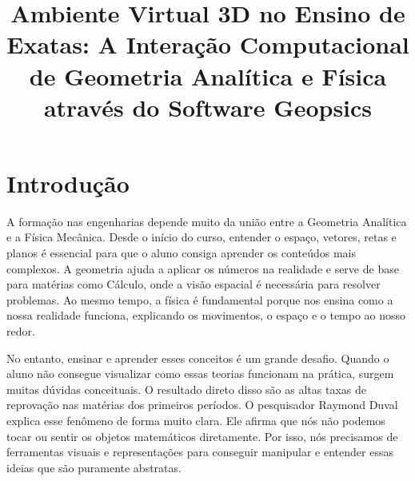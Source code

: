 \documentclass[conference,a4paper]{IEEEtran}
\begin{document}
\title{Ambiente Virtual 3D no Ensino de Exatas: A Interação Computacional de Geometria Analítica e Física através do Software Geopsics}

\author{
\and
}

\maketitle

\section{Introdução}

A formação nas engenharias depende muito da união entre a Geometria Analítica e a Física Mecânica. Desde o início do curso, entender o espaço, vetores, retas e planos é essencial para que o aluno consiga aprender os conteúdos mais complexos. A geometria ajuda a aplicar os números na realidade e serve de base para matérias como Cálculo, onde a visão espacial é necessária para resolver problemas. Ao mesmo tempo, a física é fundamental porque nos ensina como a nossa realidade funciona, explicando os movimentos, o espaço e o tempo ao nosso redor.

No entanto, ensinar e aprender esses conceitos é um grande desafio. Quando o aluno não consegue visualizar como essas teorias funcionam na prática, surgem muitas dúvidas conceituais. O resultado direto disso são as altas taxas de reprovação nas matérias dos primeiros períodos. O pesquisador Raymond Duval explica esse fenômeno de forma muito clara. Ele afirma que nós não podemos tocar ou sentir os objetos matemáticos diretamente. Por isso, nós precisamos de ferramentas visuais e representações para conseguir manipular e entender essas ideias que são puramente abstratas.
\end{document}
